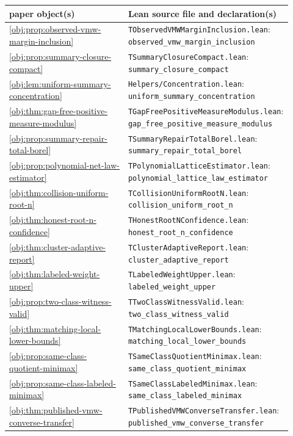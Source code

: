 \documentclass[11pt]{article}
\begin{document}
\begin{center}
\scriptsize
\begin{tabular}{p{0.42\linewidth}p{0.5\linewidth}}
paper object(s) & Lean source file and declaration(s)\\
\hline
\cref{obj:prop:observed-vmw-margin-inclusion} & \texttt{TObservedVMWMarginInclusion.lean}: \texttt{observed\_vmw\_margin\_inclusion}\\
\cref{obj:prop:summary-closure-compact} & \texttt{TSummaryClosureCompact.lean}: \texttt{summary\_closure\_compact}\\
\cref{obj:lem:uniform-summary-concentration} & \texttt{Helpers/Concentration.lean}: \texttt{uniform\_summary\_concentration}\\
\cref{obj:thm:gap-free-positive-measure-modulus} & \texttt{TGapFreePositiveMeasureModulus.lean}: \texttt{gap\_free\_positive\_measure\_modulus}\\
\cref{obj:prop:summary-repair-total-borel} & \texttt{TSummaryRepairTotalBorel.lean}: \texttt{summary\_repair\_total\_borel}\\
\cref{obj:prop:polynomial-net-law-estimator} & \texttt{TPolynomialLatticeEstimator.lean}: \texttt{polynomial\_lattice\_law\_estimator}\\
\cref{obj:thm:collision-uniform-root-n} & \texttt{TCollisionUniformRootN.lean}: \texttt{collision\_uniform\_root\_n}\\
\cref{obj:thm:honest-root-n-confidence} & \texttt{THonestRootNConfidence.lean}: \texttt{honest\_root\_n\_confidence}\\
\cref{obj:thm:cluster-adaptive-report} & \texttt{TClusterAdaptiveReport.lean}: \texttt{cluster\_adaptive\_report}\\
\cref{obj:thm:labeled-weight-upper} & \texttt{TLabeledWeightUpper.lean}: \texttt{labeled\_weight\_upper}\\
\cref{obj:prop:two-class-witness-valid} & \texttt{TTwoClassWitnessValid.lean}: \texttt{two\_class\_witness\_valid}\\
\cref{obj:thm:matching-local-lower-bounds} & \texttt{TMatchingLocalLowerBounds.lean}: \texttt{matching\_local\_lower\_bounds}\\
\cref{obj:prop:same-class-quotient-minimax} & \texttt{TSameClassQuotientMinimax.lean}: \texttt{same\_class\_quotient\_minimax}\\
\cref{obj:prop:same-class-labeled-minimax} & \texttt{TSameClassLabeledMinimax.lean}: \texttt{same\_class\_labeled\_minimax}\\
\cref{obj:thm:published-vmw-converse-transfer} & \texttt{TPublishedVMWConverseTransfer.lean}: \texttt{published\_vmw\_converse\_transfer}\\

\end{tabular}
\end{center}
\end{document}
